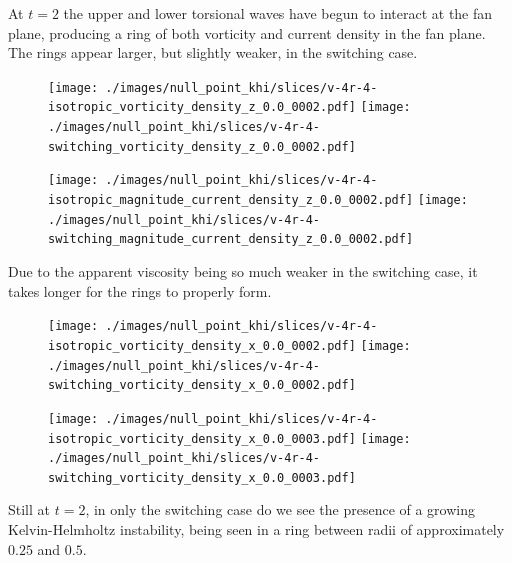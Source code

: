 

At $t=2$ the upper and lower torsional waves have begun to interact at the fan plane, producing a ring of both vorticity and current density in the fan plane. The rings appear larger, but slightly weaker, in the switching case. 

\begin{figure}[H]
  \centering
  \texttt{[image: ./images/null\_point\_khi/slices/v-4r-4-isotropic\_vorticity\_density\_z\_0.0\_0002.pdf]}
  \texttt{[image: ./images/null\_point\_khi/slices/v-4r-4-switching\_vorticity\_density\_z\_0.0\_0002.pdf]}
\end{figure}

\begin{figure}[H]
  \centering
  \texttt{[image: ./images/null\_point\_khi/slices/v-4r-4-isotropic\_magnitude\_current\_density\_z\_0.0\_0002.pdf]}
  \texttt{[image: ./images/null\_point\_khi/slices/v-4r-4-switching\_magnitude\_current\_density\_z\_0.0\_0002.pdf]}
\end{figure}

Due to the apparent viscosity being so much weaker in the switching case, it takes longer for the rings to properly form. 

\begin{figure}[H]
  \centering
  \texttt{[image: ./images/null\_point\_khi/slices/v-4r-4-isotropic\_vorticity\_density\_x\_0.0\_0002.pdf]}
  \texttt{[image: ./images/null\_point\_khi/slices/v-4r-4-switching\_vorticity\_density\_x\_0.0\_0002.pdf]}
\end{figure}

\begin{figure}[H]
  \centering
  \texttt{[image: ./images/null\_point\_khi/slices/v-4r-4-isotropic\_vorticity\_density\_x\_0.0\_0003.pdf]}
  \texttt{[image: ./images/null\_point\_khi/slices/v-4r-4-switching\_vorticity\_density\_x\_0.0\_0003.pdf]}
\end{figure}

Still at $t=2$, in only the switching case do we see the presence of a growing Kelvin-Helmholtz instability, being seen in a ring between radii of approximately $0.25$ and $0.5$.

